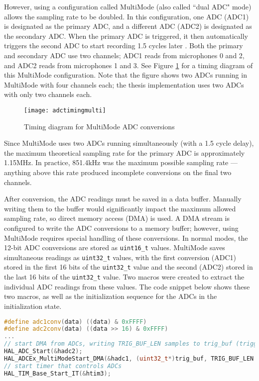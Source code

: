 \documentclass[11pt]{ucthesisCP}
\begin{document}
However, using a configuration called MultiMode (also called ``dual ADC" mode) allows the sampling rate to be doubled. In this configuration, one ADC (ADC1) is designated as the primary ADC, and a different ADC (ADC2) is designated as the secondary ADC. When the primary ADC is triggered, it then automatically triggers the second ADC to start recording 1.5 cycles later \cite{stmdatasheet}. Both the primary and secondary ADC use two channels; ADC1 reads from microphones 0 and 2, and ADC2 reads from microphones 1 and 3. See Figure \ref{fig:adctimingmulti} for a timing diagram of this MultiMode configuration. Note that the figure shows two ADCs running in MultiMode with four channels each; the thesis implementation uses two ADCs with only two channels each.

\begin{figure}[htbp]
	\centering
	\texttt{[image: adctimingmulti]}
	\caption{Timing diagram for MultiMode ADC conversions \cite{stmdatasheet}}
	\label{fig:adctimingmulti}
\end{figure}

Since MultiMode uses two ADCs running simultaneously (with a 1.5 cycle delay), the maximum theoretical sampling rate for the primary ADC is approximately 1.15MHz. In practice, 851.4kHz was the maximum possible sampling rate --- anything above this rate produced incomplete conversions on the final two channels.

After conversion, the ADC readings must be saved in a data buffer. Manually writing them to the buffer would significantly impact the maximum allowed sampling rate, so direct memory access (DMA) is used. A DMA stream is configured to write the ADC conversions to a memory buffer; however, using MultiMode requires special handling of these conversions. In normal modes, the 12-bit ADC conversions are stored as \verb|uint16_t| values. MultiMode saves simultaneous readings as \verb|uint32_t| values, with the first conversion (ADC1) stored in the first 16 bits of the \verb|uint32_t| value and the second (ADC2) stored in the last 16 bits of the \verb|uint32_t| value. Two macros were created to extract the individual ADC readings from these values. The code snippet below shows these two macros, as well as the initialization sequence for the ADCs in the initialization state.

\begin{lstlisting}[language=C++]
#define adc1conv(data) ((data) & 0xFFFF)
#define adc2conv(data) ((data >> 16) & 0xFFFF)
...
// start DMA from ADCs, writing TRIG_BUF_LEN samples to trig_buf (triggering state)
HAL_ADC_Start(&hadc2);
HAL_ADCEx_MultiModeStart_DMA(&hadc1, (uint32_t*)trig_buf, TRIG_BUF_LEN * NUM_MIC / 2);
// start timer that controls ADCs
HAL_TIM_Base_Start_IT(&htim3);
\end{lstlisting}
\end{document}
